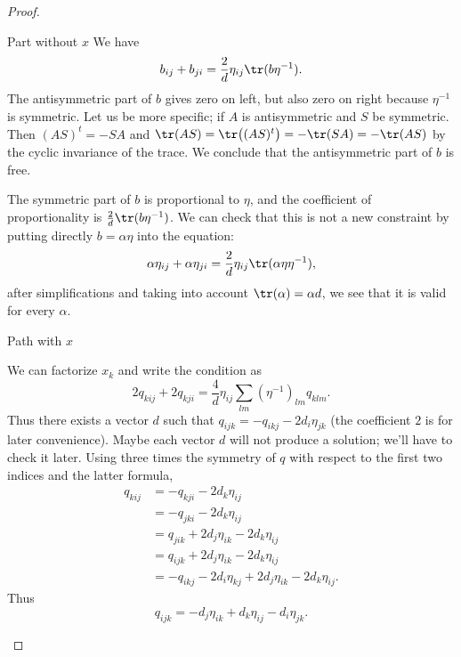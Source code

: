 \begin{proof}
    \begin{subproof}
    \item[Part without \( x\)]
        We have
        \begin{equation}
            b_{ij}+b_{ji}=\frac{ 2 }{ d }\eta_{ij}\tr(b\eta^{-1}).
        \end{equation}
        The antisymmetric part of \( b\) gives zero on left, but also zero on right because \( \eta^{-1}\) is symmetric. Let us be more specific; if \( A\) is antisymmetric and \( S\) be symmetric. Then \( (AS)^t=-SA\) and \( \tr(AS)=\tr\big( (AS)^t \big)=-\tr(SA)=-\tr(AS)\) by the cyclic invariance of the trace. We conclude that the antisymmetric part of \( b\) is free.

        The symmetric part of \( b\) is proportional to \( \eta\), and the coefficient of proportionality is \( \frac{ 2 }{ d }\tr(b\eta^{-1})\). We can check that this is not a new constraint by putting directly \( b=\alpha\eta\) into the equation:
        \begin{equation}
            \alpha\eta_{ij}+\alpha\eta_{ji}=\frac{ 2 }{ d }\eta_{ij}\tr(\alpha\eta\eta^{-1}),
        \end{equation}
        after simplifications and taking into account \( \tr(\alpha)=\alpha d\), we see that it is valid for every \( \alpha\).
    \item[Path with \( x\)]

        We can factorize \( x_k\) and write the condition as
        \begin{equation}
            2q_{kij}+2q_{kji}=\frac{ 4 }{ d }\eta_{ij}\sum_{lm}(\eta^{-1})_{lm}q_{klm}.
        \end{equation}
        Thus there exists a vector \( d\) such that \( q_{ijk}=-q_{ikj}-2d_i\eta_{jk}\) (the coefficient \( 2\) is for later convenience). Maybe each vector \( d\) will not produce a solution; we'll have to check it later. Using three times the symmetry of \( q\) with respect to the first two indices and the latter formula,
        \begin{subequations}
            \begin{align}
                q_{kij}&=-q_{kji}-2d_k\eta_{ij}\\
                &=-q_{jki}-2d_k\eta_{ij}\\
                &=q_{jik}+2d_j\eta_{ik}-2d_k\eta_{ij}\\
                &=q_{ijk}+2d_j\eta_{ik}-2d_k\eta_{ij}\\
                &=-q_{ikj}-2d_i\eta_{kj}+2d_j\eta_{ik}-2d_k\eta_{ij}.
            \end{align}
        \end{subequations}
        Thus
        \begin{equation}    \label{EQooKZVTooWSMmyM}
            q_{ijk}=-d_j\eta_{ik}+d_k\eta_{ij}-d_i\eta_{jk}.
        \end{equation}
    \end{subproof}


\end{proof}
